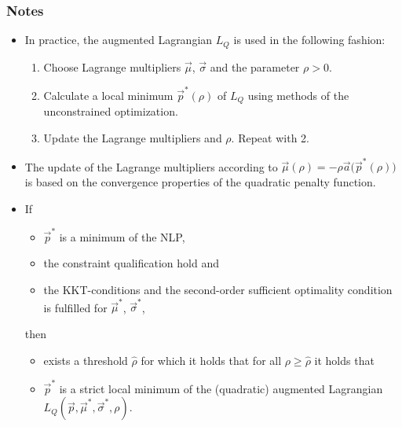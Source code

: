 			\subsubsection{Notes}
				\begin{itemize}
					\item In practice, the augmented Lagrangian \( L_Q \) is used in the following fashion:
						\begin{enumerate}
							\item Choose Lagrange multipliers \( \vec{\mu} \), \( \vec{\sigma} \) and the parameter \( \rho > 0 \).
							\item Calculate a local minimum \( \vec{p}^\ast(\rho) \) of \( L_Q \) using methods of the unconstrained optimization.
							\item Update the Lagrange multipliers and \(\rho\). Repeat with 2.
						\end{enumerate}
					\item The update of the Lagrange multipliers according to \( \vec{\mu}(\rho) = -\rho \vec{a}\big(\vec{p}^\ast(\rho)\big) \) is based on the convergence properties of the quadratic penalty function.
					\item If
						\begin{itemize}
							\item \(\vec{p}^\ast\) is a minimum of the NLP,
							\item the constraint qualification hold and
							\item the KKT-conditions and the second-order sufficient optimality condition is fulfilled for \( \vec{\mu}^\ast \), \( \vec{\sigma}^\ast \),
						\end{itemize}
						then
						\begin{itemize}
							\item exists a threshold \(\hat{\rho}\) for which it holds that for all \( \rho \geq \hat{\rho} \) it holds that
							\item \(\vec{p}^\ast\) is a strict local minimum of the (quadratic) augmented Lagrangian \( L_Q(\vec{p}, \vec{\mu}^\ast, \vec{\sigma}^\ast, \rho) \).
						\end{itemize}
				\end{itemize}

